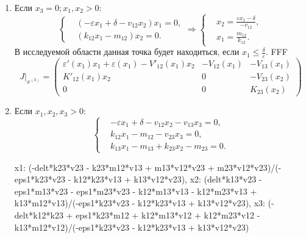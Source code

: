 \begin{enumerate}
\[\begin{matrix}
                        0 & K_{12}(x_1) - V'_{23} (0) x_3 & 0 \\
                        K'_{13} (x_1) x_3 & K'_{23} (0) x_3 & K_{23} (0)
                    \end{matrix}
                \right)
            \]
        \item Если \( x_3 = 0; x_1, x_2 > 0 \):
            \[
                \left\{\begin{split}
                    & \left( -\varepsilon x_1 + \delta - v_{12} x_2 \right)x_1 = 0, \\
                    & ( k_{12} x_1 -m _{12} ) x_2 = 0. 
                \end{split}\right.
                \Rightarrow
                \left\{\begin{split}
                    & x_2 = \frac{ \varepsilon x_1 - \delta }{ -v_{12} }, \\
                    & x_1 = \frac{m_{12}}{k_{12}}. 
                \end{split}\right.
            \]
            В исследуемой области данная точка будет находиться, если \( x_1 \leq \frac{\delta}{\varepsilon}  \). FFF
            \[
                J\big|_{x^{(3)}} = \left(
                    \begin{matrix}
                        \varepsilon'(x_1) x_1 + \varepsilon(x_1) - V'_{12}(x_1) x_2 & -V_{12} (x_1) & -V_{13} (x_1) \\
                        K'_{12} (x_1) x_2 & 0 & -V_{23}(x_2) \\
                        0 & 0 & K_{23} (x_2)
                    \end{matrix}
                \right)
            \]
        \item Если \( x_1, x_2, x_3 > 0 \):
            \[
                \left\{\begin{split}
                    & -\varepsilon x_1 + \delta - v_{12} x_2 - v_{13} x_3 = 0, \\
                    & k_{12} x_1 - m_{12} - v_{23} x_3 = 0, \\
                    & k_{13} x_1 - m_{13} + k_{23} x_2 - m_{23} = 0. 
                \end{split}\right.
            \]

            {x1: (-delt*k23*v23 - k23*m12*v13 + m13*v12*v23 + m23*v12*v23)/(-eps1*k23*v23 - k12*k23*v13 + k13*v12*v23), x2: (delt*k13*v23 - eps1*m13*v23 - eps1*m23*v23 - k12*m13*v13 - k12*m23*v13 + k13*m12*v13)/(-eps1*k23*v23 - k12*k23*v13 + k13*v12*v23), x3: (-delt*k12*k23 + eps1*k23*m12 + k12*m13*v12 + k12*m23*v12 - k13*m12*v12)/(-eps1*k23*v23 - k12*k23*v13 + k13*v12*v23)} 


    \end{enumerate}